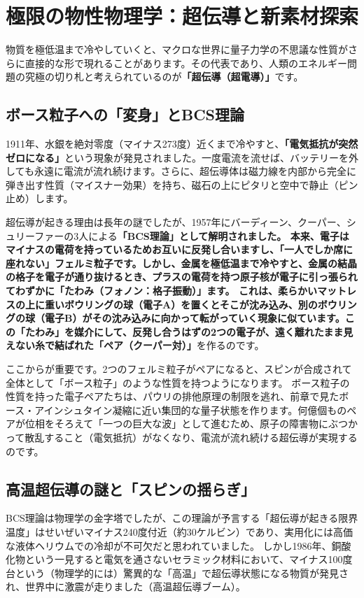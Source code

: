 \section{極限の物性物理学：超伝導と新素材探索}

物質を極低温まで冷やしていくと、マクロな世界に量子力学の不思議な性質がさらに直接的な形で現れることがあります。その代表であり、人類のエネルギー問題の究極の切り札と考えられているのが\textbf{「超伝導（超電導）」}です。

\subsection{ボース粒子への「変身」とBCS理論}

1911年、水銀を絶対零度（マイナス273度）近くまで冷やすと、\textbf{「電気抵抗が突然ゼロになる」}という現象が発見されました。一度電流を流せば、バッテリーを外しても永遠に電流が流れ続けます。さらに、超伝導体は磁力線を内部から完全に弾き出す性質（マイスナー効果）を持ち、磁石の上にピタリと空中で静止（ピン止め）します。

超伝導が起きる理由は長年の謎でしたが、1957年にバーディーン、クーパー、シュリーファーの3人による\textbf{「BCS理論」として解明されました。 本来、電子はマイナスの電荷を持っているためお互いに反発し合いますし、「一人でしか席に座れない」フェルミ粒子です。しかし、金属を極低温まで冷やすと、金属の結晶の格子を電子が通り抜けるとき、プラスの電荷を持つ原子核が電子に引っ張られてわずかに「たわみ（フォノン：格子振動）」ます。 これは、柔らかいマットレスの上に重いボウリングの球（電子A）を置くとそこが沈み込み、別のボウリングの球（電子B）がその沈み込みに向かって転がっていく現象に似ています。この「たわみ」を媒介にして、反発し合うはずの2つの電子が、遠く離れたまま見えない糸で結ばれた「ペア（クーパー対）」}を作るのです。

ここからが重要です。2つのフェルミ粒子がペアになると、スピンが合成されて全体として「ボース粒子」のような性質を持つようになります。 ボース粒子の性質を持った電子ペアたちは、パウリの排他原理の制限を逃れ、前章で見たボース・アインシュタイン凝縮に近い集団的な量子状態を作ります。何億個ものペアが位相をそろえて「一つの巨大な波」として進むため、原子の障害物にぶつかって散乱すること（電気抵抗）がなくなり、電流が流れ続ける超伝導が実現するのです。

\subsection{高温超伝導の謎と「スピンの揺らぎ」}

BCS理論は物理学の金字塔でしたが、この理論が予言する「超伝導が起きる限界温度」はせいぜいマイナス240度付近（約30ケルビン）であり、実用化には高価な液体ヘリウムでの冷却が不可欠だと思われていました。 しかし1986年、銅酸化物という一見すると電気を通さないセラミック材料において、マイナス100度台という（物理学的には）驚異的な「高温」で超伝導状態になる物質が発見され、世界中に激震が走りました（高温超伝導ブーム）。


